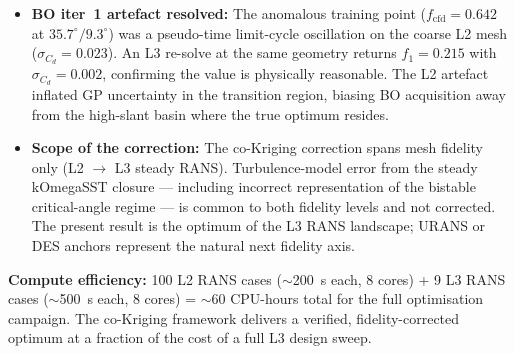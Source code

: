 \begin{itemize}
    \item \textbf{BO iter~1 artefact resolved:} The anomalous training point ($f_\mathrm{cfd}=0.642$ at $35.7^\circ/9.3^\circ$) was a pseudo-time limit-cycle oscillation on the coarse L2 mesh ($\sigma_{C_d}=0.023$). An L3 re-solve at the same geometry returns $f_1=0.215$ with $\sigma_{C_d}=0.002$, confirming the value is physically reasonable. The L2 artefact inflated GP uncertainty in the transition region, biasing BO acquisition away from the high-slant basin where the true optimum resides.

    \item \textbf{Scope of the correction:} The co-Kriging correction spans mesh fidelity only (L2 $\to$ L3 steady RANS). Turbulence-model error from the steady kOmegaSST closure — including incorrect representation of the bistable critical-angle regime — is common to both fidelity levels and not corrected. The present result is the optimum of the L3 RANS landscape; URANS or DES anchors represent the natural next fidelity axis.
\end{itemize}

\textbf{Compute efficiency:} 100 L2 RANS cases (${\sim}$200~s each, 8 cores) + 9 L3 RANS cases (${\sim}$500~s each, 8 cores) = ${\sim}$60 CPU-hours total for the full optimisation campaign. The co-Kriging framework delivers a verified, fidelity-corrected optimum at a fraction of the cost of a full L3 design sweep.

